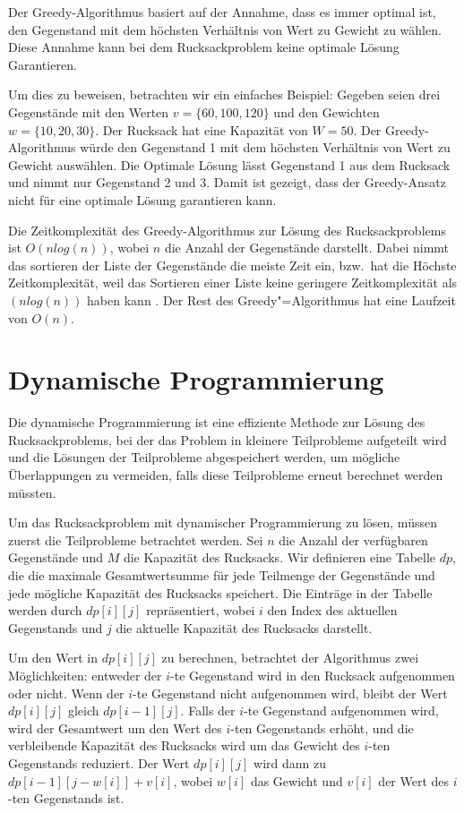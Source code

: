 Der Greedy-Algorithmus basiert auf der Annahme, dass es 
immer optimal ist, den Gegenstand mit dem höchsten Verhältnis 
von Wert zu Gewicht zu wählen. Diese Annahme kann bei dem Rucksackproblem
keine optimale Lösung Garantieren.

Um dies zu beweisen, betrachten wir ein einfaches Beispiel: 
Gegeben seien drei Gegenstände mit den Werten $v = \{60, 100, 120\}$ 
und den Gewichten $w =\{10, 20, 30\}$. Der Rucksack hat eine Kapazität 
von $W = 50$. Der Greedy-Algorithmus würde den Gegenstand 1 mit 
dem höchsten Verhältnis von Wert zu Gewicht auswählen. Die Optimale 
Lösung lässt Gegenstand 1 aus dem Rucksack und nimmt nur Gegenstand 2 und 3.
Damit ist gezeigt, dass der Greedy-Ansatz nicht für eine optimale Lösung 
garantieren kann.

Die Zeitkomplexität des Greedy-Algorithmus zur Lösung des 
Rucksackproblems ist $O(nlog(n))$, 
wobei $n$ die Anzahl der Gegenstände darstellt. Dabei nimmt das 
sortieren der Liste der Gegenstände die meiste Zeit ein, bzw.\ hat 
die Höchste Zeitkomplexität, weil das Sortieren einer Liste 
keine geringere Zeitkomplexität als $(nlog(n))$ haben kann 
. Der Rest des Greedy"=Algorithmus hat eine 
Laufzeit von $O(n)$.\ \cite[vgl.]{cormen2022introduction}

\section{Dynamische Programmierung}
Die dynamische Programmierung ist eine effiziente Methode zur 
Lösung des Rucksackproblems, bei der das Problem in kleinere 
Teilprobleme aufgeteilt wird und die Lösungen der Teilprobleme 
abgespeichert werden, um mögliche Überlappungen zu vermeiden, falls 
diese Teilprobleme erneut berechnet werden müssten.

Um das Rucksackproblem mit dynamischer Programmierung zu 
lösen, müssen zuerst die Teilprobleme betrachtet werden. Sei $n$ die 
Anzahl der verfügbaren Gegenstände und $M$ die Kapazität des 
Rucksacks. Wir definieren eine Tabelle $dp$, die die maximale 
Gesamtwertsumme für jede Teilmenge der Gegenstände und jede 
mögliche Kapazität des Rucksacks speichert. Die Einträge in 
der Tabelle werden durch $dp[i][j]$ repräsentiert, wobei $i$ den 
Index des aktuellen Gegenstands und $j$ die aktuelle Kapazität 
des Rucksacks darstellt.

Um den Wert in $dp[i][j]$ zu berechnen, betrachtet der Algorithmus 
zwei Möglichkeiten: entweder der $i$-te Gegenstand wird in den 
Rucksack aufgenommen oder nicht. Wenn der $i$-te Gegenstand 
nicht aufgenommen wird, bleibt der Wert $dp[i][j]$ gleich 
$dp[i-1][j]$. Falls der $i$-te Gegenstand aufgenommen wird, wird 
der Gesamtwert um den Wert des $i$-ten Gegenstands erhöht, und 
die verbleibende Kapazität des Rucksacks wird um das Gewicht 
des $i$-ten Gegenstands reduziert. Der Wert $dp[i][j]$ wird dann 
zu $dp[i-1][j-w[i]] + v[i]$, wobei $w[i]$ das Gewicht und $v[i]$ 
der Wert des $i$-ten Gegenstands ist.

